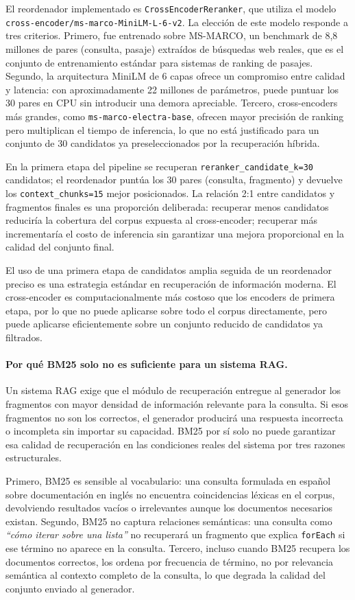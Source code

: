 \documentclass[11pt]{article}
\begin{document}
El reordenador implementado es \texttt{CrossEncoderReranker}, que utiliza el modelo
\texttt{cross-encoder/ms-marco-MiniLM-L-6-v2}. La elección de este modelo responde a tres
criterios. Primero, fue entrenado sobre MS-MARCO, un benchmark de 8,8 millones de pares
(consulta, pasaje) extraídos de búsquedas web reales, que es el conjunto de entrenamiento
estándar para sistemas de ranking de pasajes. Segundo, la arquitectura MiniLM de 6 capas
ofrece un compromiso entre calidad y latencia: con aproximadamente 22 millones de parámetros,
puede puntuar los 30 pares en CPU sin introducir una demora apreciable. Tercero, cross-encoders
más grandes, como \texttt{ms-marco-electra-base}, ofrecen mayor precisión de ranking pero
multiplican el tiempo de inferencia, lo que no está justificado para un conjunto de 30
candidatos ya preseleccionados por la recuperación híbrida.

En la primera etapa del pipeline se recuperan \texttt{reranker\_candidate\_k=30} candidatos;
el reordenador puntúa los 30 pares (consulta, fragmento) y devuelve los
\texttt{context\_chunks=15} mejor posicionados. La relación 2:1 entre candidatos y fragmentos
finales es una proporción deliberada: recuperar menos candidatos reduciría la cobertura del
corpus expuesta al cross-encoder; recuperar más incrementaría el costo de inferencia sin
garantizar una mejora proporcional en la calidad del conjunto final.

El uso de una primera etapa de candidatos amplia seguida de un reordenador preciso es una
estrategia estándar en recuperación de información moderna. El cross-encoder es computacionalmente
más costoso que los encoders de primera etapa, por lo que no puede aplicarse sobre todo el corpus
directamente, pero puede aplicarse eficientemente sobre un conjunto reducido de candidatos ya
filtrados.

\paragraph{Por qué BM25 solo no es suficiente para un sistema RAG.}
Un sistema RAG exige que el módulo de recuperación entregue al generador los fragmentos con
mayor densidad de información relevante para la consulta. Si esos fragmentos no son los
correctos, el generador producirá una respuesta incorrecta o incompleta sin importar su
capacidad. BM25 por sí solo no puede garantizar esa calidad de recuperación en las condiciones
reales del sistema por tres razones estructurales.

Primero, BM25 es sensible al vocabulario: una consulta formulada en español sobre documentación
en inglés no encuentra coincidencias léxicas en el corpus, devolviendo resultados vacíos o
irrelevantes aunque los documentos necesarios existan. Segundo, BM25 no captura relaciones
semánticas: una consulta como \emph{``cómo iterar sobre una lista''} no recuperará un fragmento
que explica \texttt{forEach} si ese término no aparece en la consulta. Tercero, incluso cuando
BM25 recupera los documentos correctos, los ordena por frecuencia de término, no por relevancia
semántica al contexto completo de la consulta, lo que degrada la calidad del conjunto enviado
al generador.
\end{document}
